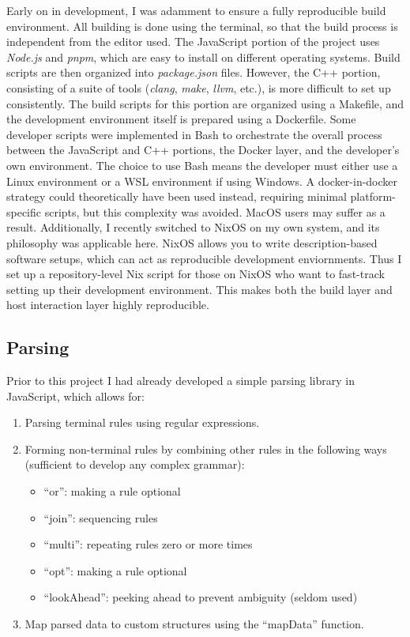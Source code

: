 \documentclass[12pt,a4paper,twoside]{report}
\begin{document}
Early on in development, I was adamment to ensure a fully reproducible build environment. All building is done using the terminal, so that the build process is independent from the editor used. The JavaScript portion of the project uses \textit{Node.js} and \textit{pnpm}, which are easy to install on different operating systems. Build scripts are then organized into \textit{package.json} files. However, the C++ portion, consisting of a suite of tools (\textit{clang}, \textit{make}, \textit{llvm}, etc.), is more difficult to set up consistently. The build scripts for this portion are organized using a Makefile, and the development environment itself is prepared using a Dockerfile. Some developer scripts were implemented in Bash to orchestrate the overall process between the JavaScript and C++ portions, the Docker layer, and the developer's own environment. The choice to use Bash means the developer must either use a Linux environment or a WSL environment if using Windows. A docker-in-docker strategy could theoretically have been used instead, requiring minimal platform-specific scripts, but this complexity was avoided. MacOS users may suffer as a result. Additionally, I recently switched to NixOS on my own system, and its philosophy was applicable here. NixOS allows you to write description-based software setups, which can act as reproducible development enviornments. Thus I set up a repository-level Nix script for those on NixOS who want to fast-track setting up their development environment. This makes both the build layer and host interaction layer highly reproducible.

\subsection{Parsing}

Prior to this project I had already developed a simple parsing library in JavaScript, which allows for:

\begin{enumerate}
	\item Parsing terminal rules using regular expressions.
	\item Forming non-terminal rules by combining other rules in the following ways (sufficient to develop any complex grammar): \begin{itemize}
	\item ``or'': making a rule optional
	\item ``join'': sequencing rules
	\item ``multi'': repeating rules zero or more times
	\item ``opt'': making a rule optional
	\item ``lookAhead'': peeking ahead to prevent ambiguity (seldom used)
	\end{itemize}
	\item Map parsed data to custom structures using the ``mapData'' function.
\end{enumerate}
\end{document}
